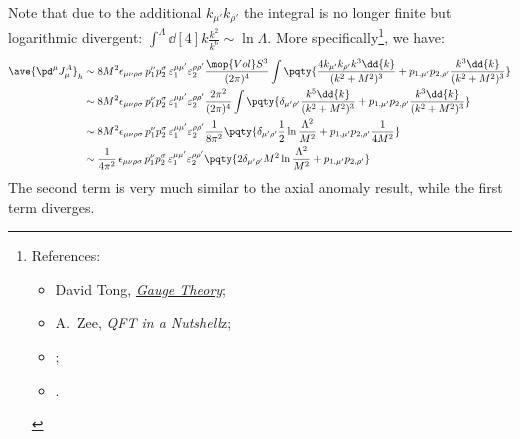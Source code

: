 \documentclass[a4paper,10pt]{article}
\begin{document}
\begin{enumerate}
\begin{enumerate}
	Note that due to the additional $k_{\mu'}k_{\rho'}$ the integral is no longer finite but logarithmic divergent: $
		\int^\Lambda \dd[4]{k} \frac{k^2}{k^6}
		\sim \ln \Lambda
	$. More specifically\footnote{
		References: 
		\begin{itemize}[
			labelindent=3em,labelsep=1pt
		]
		\item David Tong, \href{https://www.damtp.cam.ac.uk/user/tong/gaugetheory.html}{\textit{Gauge Theory}};
		\item A.~Zee, \textit{QFT in a Nutshell}z;
		\item {};
		\item {}. 
		\end{itemize}
	}, we have:
	\begin{gather}
	\begin{aligned}
		\ave{\pd^\mu J_\mu^A}_h
		&\sim 8M^2 \epsilon_{\mu\nu\rho\sigma}\,
			p_1^\nu p_2^\sigma\,
			\varepsilon_1^{\mu\mu'}
			\varepsilon_2^{\rho\rho'}
			\frac{\mop{Vol} S^3}{(2\pi)^4}
			\int \pqty{
				\frac{
					4k_{\mu'}k_{\rho'}
					k^3 \dd{k}
				}{(k^2 + M^2)^3}
				+ p_{1,\mu'} p_{2,\rho'}
				\frac{
					k^3 \dd{k}
				}{(k^2 + M^2)^3}
			} \\
		&\sim 8M^2 \epsilon_{\mu\nu\rho\sigma}\,
			p_1^\nu p_2^\sigma\,
			\varepsilon_1^{\mu\mu'}
			\varepsilon_2^{\rho\rho'}
			\frac{2\pi^2}{(2\pi)^4}
			\int \pqty{
				\delta_{\mu'\rho'}
				\frac{
					k^5 \dd{k}
				}{(k^2 + M^2)^3}
				+ p_{1,\mu'} p_{2,\rho'}
				\frac{
					k^3 \dd{k}
				}{(k^2 + M^2)^3}
			} \\
		&\sim 8M^2 \epsilon_{\mu\nu\rho\sigma}\,
			p_1^\nu p_2^\sigma\,
			\varepsilon_1^{\mu\mu'}
			\varepsilon_2^{\rho\rho'}
			\frac{1}{8\pi^2}
			\pqty{
				\delta_{\mu'\rho'}
				\frac{1}{2}
					\ln \frac{\Lambda^2}{M^2}
				+ p_{1,\mu'} p_{2,\rho'}
				\frac{1}{4M^2}
			} \\
		&\sim \frac{1}{4\pi^2}\,
			\epsilon_{\mu\nu\rho\sigma}\,
			p_1^\nu p_2^\sigma\,
			\varepsilon_1^{\mu\mu'}
			\varepsilon_2^{\rho\rho'}
			\pqty{
				2\delta_{\mu'\rho'} M^2
					\ln \frac{\Lambda^2}{M^2}
				+ p_{1,\mu'} p_{2,\rho'}
			}
	\end{aligned}
	\end{gather}
	The second term is very much similar to the axial anomaly result, while the first term diverges.
	

\end{enumerate}
\end{enumerate}
\end{document}
